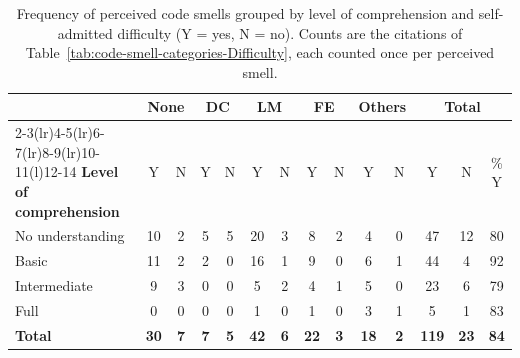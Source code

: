 \begin{table}[t]
\footnotesize
\centering
\caption{Frequency of perceived code smells grouped by level of comprehension and self-admitted difficulty (Y = yes, N = no). Counts are the citations of Table~\ref{tab:code-smell-categories-Difficulty}, each counted once per perceived smell.}
\label{tab:smell-frequency-level-difficulty}
\setlength{\tabcolsep}{4pt}
\begin{tabular}{@{}l *{10}{c} @{\hspace{10pt}} ccc@{}}
\toprule
& \multicolumn{2}{c}{\textbf{None}} & \multicolumn{2}{c}{\textbf{DC}}
& \multicolumn{2}{c}{\textbf{LM}}   & \multicolumn{2}{c}{\textbf{FE}}
& \multicolumn{2}{c}{\textbf{Others}} & \multicolumn{3}{c}{\textbf{Total}} \\
\cmidrule(lr){2-3}\cmidrule(lr){4-5}\cmidrule(lr){6-7}\cmidrule(lr){8-9}\cmidrule(lr){10-11}\cmidrule(l){12-14}
\textbf{Level of comprehension} & Y & N & Y & N & Y & N & Y & N & Y & N & Y & N & \% Y \\
\midrule
No understanding & 10 & 2  & 5  & 5  & 20 & 3  & 8  & 2  & 4  & 0  & 47 & 12 & 80 \\
Basic            & 11 & 2  & 2  & 0  & 16 & 1  & 9  & 0  & 6  & 1  & 44 & 4  & 92 \\
Intermediate     & 9  & 3  & 0  & 0  & 5  & 2  & 4  & 1  & 5  & 0  & 23 & 6  & 79 \\
Full             & 0  & 0  & 0  & 0  & 1  & 0  & 1  & 0  & 3  & 1  & 5  & 1  & 83 \\
\midrule
\textbf{Total}   & \textbf{30} & \textbf{7} & \textbf{7} & \textbf{5} & \textbf{42} & \textbf{6} & \textbf{22} & \textbf{3} & \textbf{18} & \textbf{2} & \textbf{119} & \textbf{23} & \textbf{84} \\
\bottomrule
\end{tabular}
\end{table}
